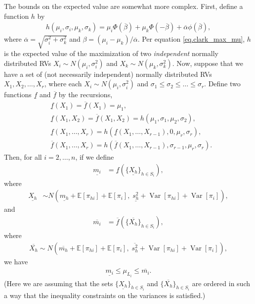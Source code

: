 \documentclass[12pt]{article}
\def\E{\mathbb{E}}
\def\Var{\operatorname{Var}}
\begin{document}
The bounds on the expected value are somewhat more complex. First, define a function $h$ by
\begin{align*}
  h(\mu_i, \sigma_i, \mu_k, \sigma_k) = \mu_i \Phi(\overline{\beta}) + \mu_k \Phi(-\overline{\beta}) + \overline{\alpha} \phi(\overline{\beta}),
\end{align*}
where $\overline{\alpha} = \sqrt{\sigma_i^2 + \sigma_k^2}$ and $\beta = (\mu_i - \mu_k)/ \overline{\alpha}$. Per equation \eqref{eq.clark_max_mu}, $h$ is the expected value of the maximization of two {\em independent} normally distributed RVs $X_i \sim N(\mu_i, \sigma_i^2)$ and $X_k \sim N(\mu_k, \sigma_k^2)$. Now, suppose that we have a set of (not necessarily independent) normally distributed RVs $X_1, X_2, \dots, X_r$, where each $X_i \sim N(\mu_i, \sigma_i^2)$ and $\sigma_1 \leq \sigma_2 \leq \dots \leq \sigma_r$. Define two functions $\underline{f}$ and $\overline{f}$ by the recursions,
\begin{align*}
  &\underline{f}(X_1) = \overline{f}(X_1) = \mu_1, \\
  &\underline{f}(X_1, X_2) = \overline{f}(X_1, X_2) = h(\mu_1, \sigma_1, \mu_2, \sigma_2), \\
  &\underline{f}(X_1, \dots, X_r) = h(\underline{f}(X_1, \dots, X_{r - 1}), 0, \mu_r, \sigma_r), \\
  &\overline{f}(X_1, \dots, X_r) = h(\overline{f}(X_1, \dots, X_{r - 1}), \sigma_{r - 1}, \mu_r, \sigma_r).
\end{align*}
Then, for all $i = 2, \dots, n$, if we define
\begin{align*}
  \underline{m_i} &= \underline{f}(\{ \underline{X_h} \}_{h \in S_i}),
\end{align*}
where
\begin{align*}
  \underline{X_h} &\sim N(\underline{m_h} + \E[\pi_{hi}] + \E[\pi_{i}], \; \underline{s_h^2} + \Var[\pi_{hi}] + \Var[\pi_{i}]),
\end{align*}
and
\begin{align*}
  \overline{m_i} &= \overline{f}(\{\overline{X_h}\}_{h \in S_i}),
\end{align*}
where
\begin{align*}
  \overline{X_h} \sim N(\overline{m_h} + \E[\pi_{hi}] + \E[\pi_{i}], \; \overline{s_h^2} + \Var[\pi_{hi}] + \Var[\pi_{i}]),
  \end{align*}
we have 
\begin{align*}
  \underline{m_i} \leq \mu_{L_i} \leq \overline{m_i}.
\end{align*}
(Here we are assuming that the sets $\{\underline{X_h}\}_{h \in S_i}$ and $\{\overline{X_h}\}_{h \in S_i}$ are ordered in such a way that the inequality constraints on the variances is satisfied.)
\end{document}
